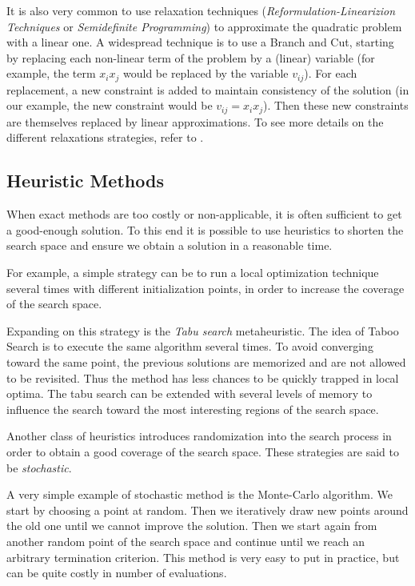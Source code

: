 It is also very common to use relaxation techniques (\emph{Reformulation-Linearizion Techniques} or \emph{Semidefinite Programming}) to approximate the quadratic problem with a linear one. A widespread technique is to use a Branch and Cut, starting by replacing each non-linear term of the problem by a (linear) variable (for example, the term $x_ix_j$ would be replaced by the variable $v_{ij}$). For each replacement, a new constraint is added to maintain consistency of the solution (in our example, the new constraint would be $v_{ij} = x_ix_j$). Then these new constraints are themselves replaced by linear approximations.
To see more details on the different relaxations strategies, refer to \cite{audet2000branch}.

\subsection{Heuristic Methods}

When exact methods are too costly or non-applicable, it is often sufficient to get a good-enough solution. To this end it is possible to use heuristics to shorten the search space and ensure we obtain a solution in a reasonable time.

For example, a simple strategy can be to run a local optimization technique several times with different initialization points, in order to increase the coverage of the search space.

Expanding on this strategy is the \emph{Tabu search} metaheuristic. The idea of Taboo Search is to execute the same algorithm several times. To avoid converging  toward the same point, the previous solutions are memorized and are not allowed to be revisited. Thus the method has less chances to be quickly trapped in local optima.
The tabu search can be extended with several levels of memory to influence the search toward the most interesting regions of the search space.

Another class of heuristics introduces randomization into the search process in order to obtain a good coverage of the search space. These strategies are said to be \emph{stochastic}.

A very simple example of stochastic method is the Monte-Carlo algorithm. We start by choosing a point at random. Then we iteratively draw new points around the old one until we cannot improve the solution. Then we start again from another random point of the search space and continue until we reach an arbitrary termination criterion.
This method is very easy to put in practice, but can be quite costly in number of evaluations.

